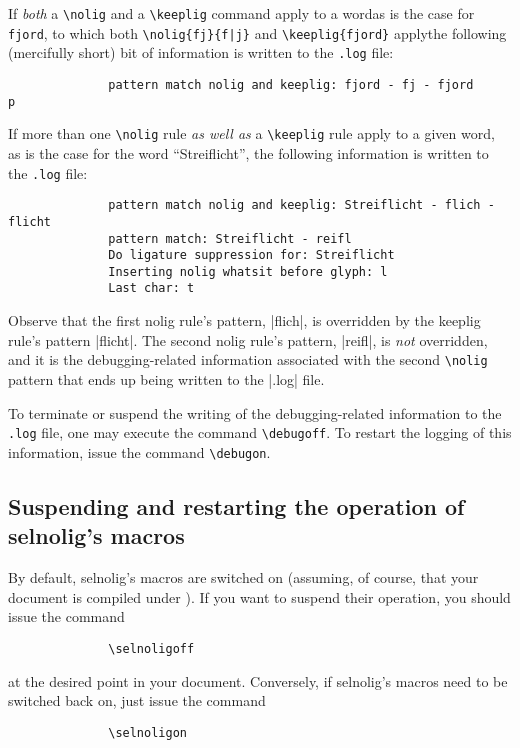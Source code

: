 \documentclass[11pt]{article}
\newcommand{\pkg}[1]{\textsf{#1}}
\newcommand{\opt}[1]{\texttt{#1}}
\newcommand{\cmmd}[1]{\texttt{\textbackslash #1}}
\begin{document}
If \emph{both} a \cmmd{nolig} and a \cmmd{keeplig} command apply to a word\textemdash as is the case for \opt{fjord}, to which both \Verb+\nolig{fj}{f|j}+ and \Verb+\keeplig{fjord}+ apply\textemdash the following (mercifully short) bit of information is written to the \opt{.log} file:
\begin{Verbatim}
              pattern match nolig and keeplig: fjord - fj - fjord
p\end{Verbatim}

If more than one \cmmd{nolig} rule \emph{as well as} a \cmmd{keeplig} rule apply to a given word, as is the case for the word \enquote{Streiflicht}, the following information is written to the \opt{.log} file:
\begin{Verbatim}
              pattern match nolig and keeplig: Streiflicht - flich - flicht
              pattern match: Streiflicht - reifl
              Do ligature suppression for: Streiflicht
              Inserting nolig whatsit before glyph: l
              Last char: t
              \end{Verbatim}

Observe that the first nolig rule's pattern, |flich|, is overridden by the keeplig rule's pattern |flicht|. The second nolig rule's pattern, |reifl|, is \emph{not} overridden, and it is the debugging-related information associated with the second \cmmd{nolig} pattern that ends up being written to the |.log| file. 

To terminate or suspend the writing of the debugging-related information to the \opt{.log} file, one may execute the command \cmmd{debugoff}. To restart the logging of this information, issue the command \cmmd{debugon}.



\subsection[Suspending and restarting the operation of selnolig's macros]{Suspending and restarting the operation of \pkg{selnolig}'s macros} \label{sec:selnoligon}

By default, \pkg{selnolig}'s macros are switched on (assuming, of course, that your document is compiled under \LuaLaTeX). If you want to suspend their operation, you should issue the command
\begin{Verbatim}
              \selnoligoff
\end{Verbatim}
at the desired point in your document. Conversely, if \pkg{selnolig}'s macros need to be switched back on, just issue the command
\begin{Verbatim}
              \selnoligon
\end{Verbatim}
\end{document}
